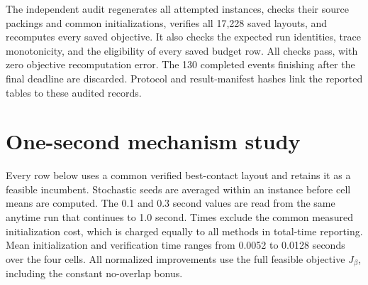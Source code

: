 \documentclass[11pt]{article}
\begin{document}
\ExtendedTimingTable

The independent audit regenerates all attempted instances, checks their
source packings and common initializations, verifies all 17,228 saved layouts,
and recomputes every saved objective. It also checks the expected run identities,
trace monotonicity, and the eligibility of every saved budget row. All checks
pass, with zero objective recomputation error. The 130 completed events
finishing after the final deadline are discarded. Protocol and result-manifest
hashes link the reported tables to these audited records.

\clearpage

\section{One-second mechanism study}
\label{app:sharedfull}

Every row below uses a common verified best-contact layout and retains it as a
feasible incumbent. Stochastic seeds are averaged within an instance before
cell means are computed. The 0.1 and 0.3 second values are read from the same
anytime run that continues to 1.0 second. Times exclude the common measured
initialization cost, which is charged equally to all methods in total-time
reporting. Mean initialization and verification time ranges from 0.0052 to
0.0128 seconds over the four cells. All normalized improvements use the full
feasible objective $J_\beta$, including the constant no-overlap bonus.
\end{document}
